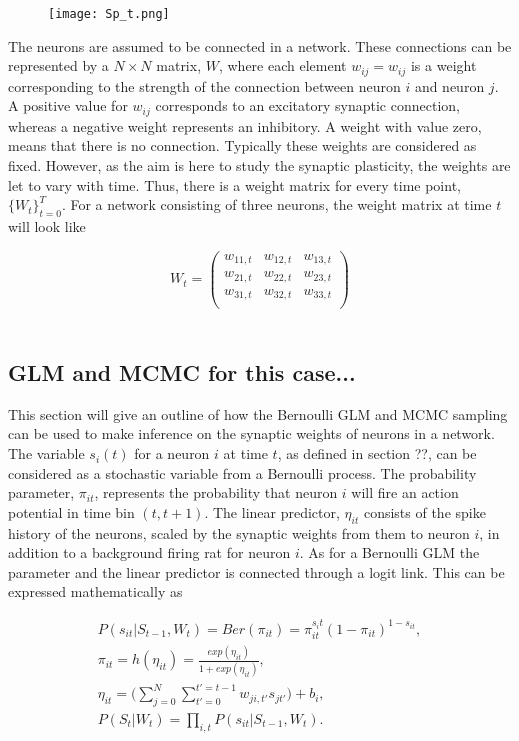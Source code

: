 \begin{figure}[h]
    \centering
    \texttt{[image: Sp\_t.png]}
\end{figure} 

The neurons are assumed to be connected in a network. These connections can be represented by a $N \times N$ matrix, $W$, where each element $w_{ij}=w_{ij}$ is a weight corresponding to the strength of the connection between neuron $i$ and neuron $j$. A positive value for $w_{ij}$ corresponds to an excitatory synaptic connection, whereas a negative weight represents an inhibitory. A weight with value zero, means that there is no connection. 
Typically these weights are considered as fixed. However, as the aim is here to study the synaptic plasticity, the weights are let to vary with time. Thus, there is a weight matrix for every time point, $\{W_t\}_{t=0}^{T}$. For a network consisting of three neurons, the weight matrix at time $t$ will look like

\begin{equation*}
W_t = 
\begin{pmatrix}
w_{11,t} & w_{12,t} & w_{13,t}\\
w_{21,t} & w_{22,t} & w_{23,t}\\
w_{31,t} & w_{32,t} & w_{33,t}\\
\end{pmatrix} 
\end{equation*}
\\

\subsection{GLM and MCMC for this case...}
This section will give an outline of how the Bernoulli GLM and MCMC sampling can be used to make inference on the synaptic weights of neurons in a network. The variable $s_i(t)$ for a neuron $i$ at time $t$, as defined in section ??, can be considered as a stochastic variable from a Bernoulli process. The probability parameter, $\pi_{it}$, represents the probability that neuron $i$ will fire an action potential in time bin $(t,t+1)$. The linear predictor, $\eta_{it}$ consists of the spike history of the neurons, scaled by the synaptic weights from them to neuron $i$, in addition to a background firing rat for neuron $i$. As for a Bernoulli GLM the parameter and the linear predictor is connected through a logit link. This can be expressed mathematically as

\begin{equation}
\begin{split}
    P(s_{it}|S_{t-1}, W_t) =  Ber(\pi_{it}) = \pi_{it}^{s_it}(1-\pi_{it})^{1-s_{it}}, \\ \pi_{it} = h(\eta_{it})= \frac{exp(\eta_{it})}{1+exp(\eta_{it})},\\
    \eta_{it} = \Big (\sum_{j=0}^{N}\sum_{t'=0}^{t'=t-1} w_{ji,t'}s_{jt'} \Big) + b_i, \\
    P(S_t|W_t) = \prod_{i,t} P(s_{it}|S_{t-1}, W_t).
\end{split}
\end{equation}

